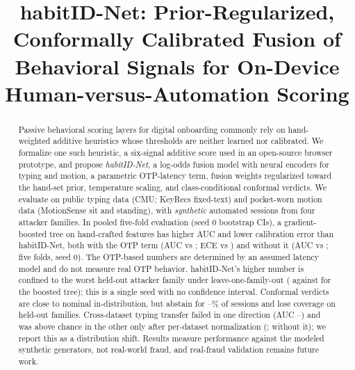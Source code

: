 \documentclass[conference]{IEEEtran}
\begin{document}
\title{habitID-Net: Prior-Regularized, Conformally Calibrated Fusion of Behavioral Signals for On-Device Human-versus-Automation Scoring}

\author{
}

\maketitle

\begin{abstract}
Passive behavioral scoring layers for digital onboarding commonly rely on hand-weighted additive heuristics whose thresholds are neither learned nor calibrated. We formalize one such heuristic, a six-signal additive score used in an open-source browser prototype, and propose \emph{habitID-Net}, a log-odds fusion model with neural encoders for typing and motion, a parametric OTP-latency term, fusion weights regularized toward the hand-set prior, temperature scaling, and class-conditional conformal verdicts. We evaluate on public typing data (CMU; KeyRecs fixed-text) and pocket-worn motion data (MotionSense sit and standing), with \emph{synthetic} automated sessions from four attacker families. In pooled five-fold evaluation (seed 0 bootstrap CIs), a gradient-boosted tree on hand-crafted features has higher AUC and lower calibration error than habitID-Net, both with the OTP term (AUC \PoolGbtAuc{} vs \PoolHabAuc{}; ECE \EceGbt{} vs \EceTsFull{}) and without it (AUC \GbtNoOtpAuc{} vs \NoOtpAuc{}; five folds, seed 0). The OTP-based numbers are determined by an assumed latency model and do not measure real OTP behavior. habitID-Net's higher number is confined to the worst held-out attacker family under leave-one-family-out (\LofoHabFamA{} against \LofoGbtFamA{} for the boosted tree); this is a single seed with no confidence interval. Conformal verdicts are close to nominal in-distribution, but abstain for \AbstainLo--\AbstainHi\% of sessions and lose coverage on held-out families. Cross-dataset typing transfer failed in one direction (AUC \XferCmuToKrOn{}--\XferCmuToKrPds{}) and was above chance in the other only after per-dataset normalization (\XferKrToCmuPds{}; \XferKrToCmuOn{} without it); we report this as a distribution shift. Results measure performance against the modeled synthetic generators, not real-world fraud, and real-fraud validation remains future work.
\end{abstract}
\end{document}
